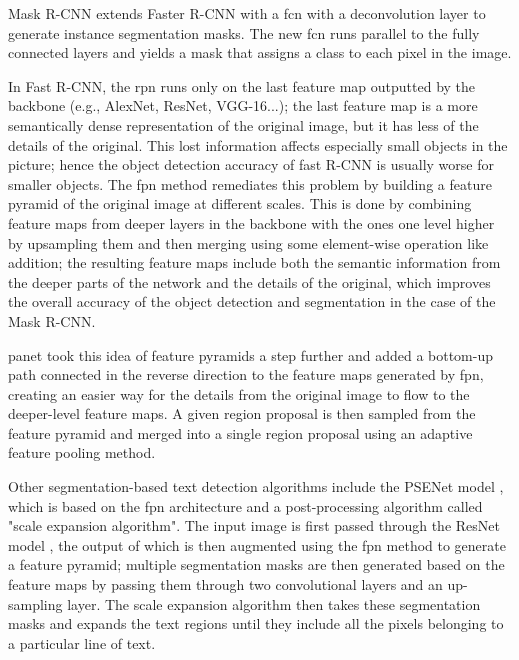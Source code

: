 \label{maskrcnn}Mask R-CNN \cite{he_mask_2017} extends Faster R-CNN with a \gls{fcn} with a deconvolution layer to generate instance segmentation masks. The new \gls{fcn} runs parallel to the fully connected layers and yields a mask that assigns a class to each pixel in the image.

In Fast R-CNN, the \gls{rpn} runs only on the last feature map outputted by the backbone (e.g., AlexNet, ResNet, VGG-16...); the last feature map is a more semantically dense representation of the original image, but it has less of the details of the original. This lost information affects especially small objects in the picture; hence the object detection accuracy of fast R-CNN is usually worse for smaller objects. The \gls{fpn} method \cite{lin_feature_2017} remediates this problem by building a feature pyramid of the original image at different scales. This is done by combining feature maps from deeper layers in the backbone with the ones one level higher by upsampling them and then merging using some element-wise operation like addition; the resulting feature maps include both the semantic information from the deeper parts of the network and the details of the original, which improves the overall accuracy of the object detection and segmentation in the case of the Mask R-CNN.

\label{panet}\gls{panet} \cite{liu_path_2018} took this idea of feature pyramids a step further and added a bottom-up path connected in the reverse direction to the feature maps generated by \gls{fpn}, creating an easier way for the details from the original image to flow to the deeper-level feature maps. A given region proposal is then sampled from the feature pyramid and merged into a single region proposal using an adaptive feature pooling method.

\label{psenet}Other segmentation-based text detection algorithms include the PSENet model \cite{wang_shape_2019}, which is based on the \gls{fpn} architecture and a post-processing algorithm called "scale expansion algorithm". The input image is first passed through the ResNet model \cite{he_deep_2016}, the output of which is then augmented using the \gls{fpn} method to generate a feature pyramid; multiple segmentation masks are then generated based on the feature maps by passing them through two convolutional layers and an up-sampling layer. The scale expansion algorithm then takes these segmentation masks and expands the text regions until they include all the pixels belonging to a particular line of text.

